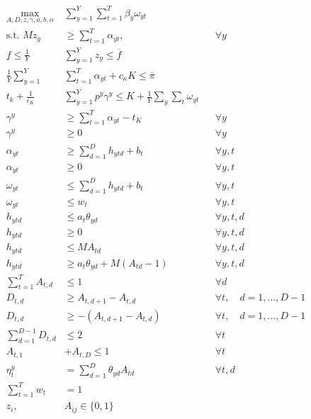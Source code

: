 \documentclass[11pt]{article}
\begin{document}
    \begin{align*}
      \max_{A,D,z,\gamma,a,b,\alpha} &\sum_{y=1}^{Y} \sum_{t=1}^{T} \beta_y \omega_{yt} \\
        \text{s.t.   } Mz_y &\geq \sum_{t=1}^{T} \alpha_{yt}, &&\forall y\\
        \underline{f} \leq \frac{1}{Y} & \sum_{y=1}^{Y} z_y \leq \overline{f}\\
        \frac{1}{Y} \sum_{y=1}^{Y} & \sum_{t=1}^{T} \alpha_{yt} + c_{\kappa}K \leq \overline{\pi}\\
        t_k + \frac{1}{\epsilon_K} &\sum_{y=1}^{Y} p^y \gamma^y \leq K + \frac{1}{Y} \sum_y \sum_t \omega_{yt}\\
        \gamma^y &\geq \sum_{t=1}^{T} \alpha_{yt} - t_K &&\forall y \\
        \gamma^y &\geq 0  &&\forall y\\
        \alpha_{yt} &\geq \sum_{d=1}^{D} h_{ytd} + b_t &&\forall y,t \\
        \alpha_{yt} &\geq 0  &&\forall y,t\\
        \omega_{yt} &\leq \sum_{d=1}^{D} h_{ytd} + b_t &&\forall y,t\\
        \omega_{yt} &\leq w_t &&\forall y,t\\
        h_{ytd} &\leq a_t \theta_{yd} &&\forall y,t,d\\
        h_{ytd} &\geq 0 &&\forall y,t,d\\
        h_{ytd} &\leq M A_{td} &&\forall y,t,d\\
        h_{ytd} &\geq a_t \theta_{yd} + M(A_{td}-1) &&\forall y,t,d\\ 
        \sum_{t=1}^{T} A_{t,d} &\leq 1 &&\forall d \\ 
        D_{t,d} &\geq A_{t,d+1}-A_{t,d} &&\forall t, \quad d=1,...,D-1\\
        D_{t,d} &\geq -(A_{t,d+1}-A_{t,d}) && \forall t, \quad d=1,...,D-1\\
        \sum_{d=1}^{D-1} D_{t,d} &\leq 2 &&\forall t \\
        A_{t,1} &+ A_{t,D} \leq 1 &&\forall t \\
        \eta_t^y &= \sum_{d=1}^{D} \theta_{yd}A_{td} &&\forall t,d \\
        \sum_{t=1}^T w_t &= 1\\
        z_i, & A_{ij} \in \{ 0,1\}
    \end{align*}

\end{document}
